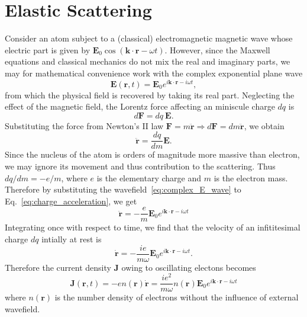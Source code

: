 \section{Elastic Scattering}

Consider an atom subject to a (classical) electromagnetic magnetic wave whose electric part is given by $\mathbf{E}_0 \cos (\mathbf{k}\cdot\mathbf{r}- \omega t)$. However, since the Maxwell equations and classical mechanics do not mix the real and imaginary parts, we may for mathematical convenience work with the complex exponential plane wave 
\begin{equation}\label{eq:complex_E_wave}
\mathbf{E}(\mathbf{r},t) = \mathbf{E}_0 e^{i \mathbf{k}\cdot\mathbf{r}-i \omega t},
\end{equation}
from which the physical field is recovered by taking its real part. Neglecting the effect of the magnetic field, the Lorentz force affecting an miniscule charge $dq$ is
\begin{equation}
d\mathbf{F} = dq \ \mathbf{E}.
\end{equation}
Substituting the force from Newton's II law $\mathbf{F} = m \ddot{\mathbf{r}} \Rightarrow d\mathbf{F} = dm \ddot{\mathbf{r}}$, we obtain
\begin{equation}\label{eq:charge_acceleration}
\ddot{\mathbf{r}} = \frac{dq}{dm} \mathbf{E}.
\end{equation}
Since the nucleus of the atom is orders of magnitude more massive than electron, we may ignore its movement and thus contribution to the scattering. Thus $dq/dm = -e/m$, where $e$ is the elementary charge and $m$ is the electron mass. Therefore by substituting the wavefield~\eqref{eq:complex_E_wave} to Eq.~\eqref{eq:charge_acceleration}, we get
\begin{equation}
\ddot{\mathbf{r}} = -\frac{e}{m} \mathbf{E}_0 e^{i \mathbf{k}\cdot\mathbf{r}-i \omega t}
\end{equation}
Integrating once with respect to time, we find that the velocity of an infititesimal charge $dq$ intially at rest is
\begin{equation}
\dot{\mathbf{r}} = -\frac{ie}{m\omega} \mathbf{E}_0 e^{i \mathbf{k}\cdot\mathbf{r}-i \omega t}.
\end{equation}
Therefore the current density $\mathbf{J}$ owing to oscillating electons becomes
\begin{equation}\label{eq:oscillating_J}
\mathbf{J}(\mathbf{r},t) = -en(\mathbf{r})\dot{\mathbf{r}} =
\frac{ie^2}{m\omega} n(\mathbf{r}) \mathbf{E}_0 e^{i \mathbf{k}\cdot\mathbf{r}-i \omega t}
\end{equation}
where $n(\mathbf{r})$ is the number density of electrons without the influence of external wavefield.

